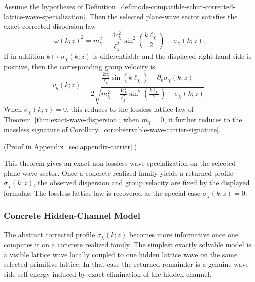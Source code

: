 \begin{theorem}
\label{thm:exact-schur-corrected-wave-dispersion}
Assume the hypotheses of
Definition~\ref{def:mode-compatible-schur-corrected-lattice-wave-specialization}.
Then the selected plane-wave sector satisfies the exact corrected dispersion law
\[
\omega(k;z)^2
=
m_{\chi}^2
+
\frac{4c_{\chi}^2}{\ell_{\chi}^2}
\sin^2\!\left(\frac{k\ell_{\chi}}{2}\right)
-
\sigma_{\chi}(k;z).
\]
If in addition \(k\mapsto \sigma_{\chi}(k;z)\) is differentiable and the
displayed right-hand side is positive, then the corresponding group velocity is
\[
v_g(k;z)
=
\frac{
\frac{2c_{\chi}^2}{\ell_{\chi}}\sin(k\ell_{\chi})
-\partial_k\sigma_{\chi}(k;z)
}{
2\sqrt{
m_{\chi}^2
+
\frac{4c_{\chi}^2}{\ell_{\chi}^2}
\sin^2\!\left(\frac{k\ell_{\chi}}{2}\right)
-
\sigma_{\chi}(k;z)
}
}.
\]
When \(\sigma_{\chi}(k;z)=0\), this reduces to the lossless lattice law of
Theorem~\ref{thm:exact-wave-dispersion}; when \(m_{\chi}=0\), it further
reduces to the massless signature of
Corollary~\ref{cor:observable-wave-carrier-signature}.
\end{theorem}

(Proof in Appendix~\ref{sec:appendix-carrier}.)

This theorem gives an exact non-lossless wave specialization on the selected
plane-wave sector. Once a concrete realized family yields a returned profile
\(\sigma_{\chi}(k;z)\), the observed dispersion and group velocity are fixed
by the displayed formulas. The lossless lattice law is recovered as the
special case \(\sigma_{\chi}(k;z)=0\).

\subsubsection{Concrete Hidden-Channel Model}

The abstract corrected profile \(\sigma_{\chi}(k;z)\) becomes more informative
once one computes it on a concrete realized family. The simplest exactly
solvable model is a visible lattice wave locally coupled to one hidden lattice
wave on the same selected primitive lattice. In that case the returned
remainder is a genuine wave-side self-energy induced by exact elimination of
the hidden channel.

